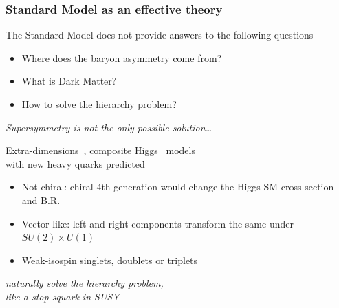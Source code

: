 \documentclass[xcolor=dvipsnames,10pt]{beamer}
\begin{document}
\begin{frame}\frametitle{Standard Model as an effective theory}
\scriptsize\centering

\myskip

The Standard Model does not provide answers to the following questions
\myskip
\begin{itemize}
\item Where does the baryon asymmetry come from?
\item What is Dark Matter?
\item How to solve the hierarchy problem?
\end{itemize}

\begin{flushright}\it Supersymmetry is not the only possible solution\dots\end{flushright}


Extra-dimensions~\cite{Csaki:2004ay}, composite Higgs~\cite{Perelstein:2005ka} models\\
with \alert{new heavy quarks predicted}~\cite{AguilarSaavedra:2009es}

\myskip

\begin{minipage}{.5\textwidth}

\begin{itemize}
\item Not chiral: chiral 4th generation would change the Higgs SM cross section and B.R.
\item Vector-like: left and right components transform the same under $SU(2)\times U(1)$
\item Weak-isospin singlets, doublets or triplets
\end{itemize}

\begin{flushright}\it naturally solve the  hierarchy problem,$\;\;$\\
like a stop squark in SUSY$\;\;$ \end{flushright}

\end{minipage}\begin{minipage}{.5\textwidth}\centering


\end{minipage}
\end{frame}
\end{document}
